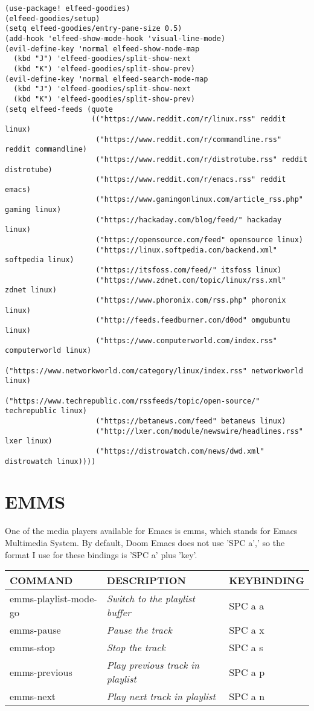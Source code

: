 \documentclass[11pt]{article}
\begin{document}
\begin{verbatim}
(use-package! elfeed-goodies)
(elfeed-goodies/setup)
(setq elfeed-goodies/entry-pane-size 0.5)
(add-hook 'elfeed-show-mode-hook 'visual-line-mode)
(evil-define-key 'normal elfeed-show-mode-map
  (kbd "J") 'elfeed-goodies/split-show-next
  (kbd "K") 'elfeed-goodies/split-show-prev)
(evil-define-key 'normal elfeed-search-mode-map
  (kbd "J") 'elfeed-goodies/split-show-next
  (kbd "K") 'elfeed-goodies/split-show-prev)
(setq elfeed-feeds (quote
                    (("https://www.reddit.com/r/linux.rss" reddit linux)
                     ("https://www.reddit.com/r/commandline.rss" reddit commandline)
                     ("https://www.reddit.com/r/distrotube.rss" reddit distrotube)
                     ("https://www.reddit.com/r/emacs.rss" reddit emacs)
                     ("https://www.gamingonlinux.com/article_rss.php" gaming linux)
                     ("https://hackaday.com/blog/feed/" hackaday linux)
                     ("https://opensource.com/feed" opensource linux)
                     ("https://linux.softpedia.com/backend.xml" softpedia linux)
                     ("https://itsfoss.com/feed/" itsfoss linux)
                     ("https://www.zdnet.com/topic/linux/rss.xml" zdnet linux)
                     ("https://www.phoronix.com/rss.php" phoronix linux)
                     ("http://feeds.feedburner.com/d0od" omgubuntu linux)
                     ("https://www.computerworld.com/index.rss" computerworld linux)
                     ("https://www.networkworld.com/category/linux/index.rss" networkworld linux)
                     ("https://www.techrepublic.com/rssfeeds/topic/open-source/" techrepublic linux)
                     ("https://betanews.com/feed" betanews linux)
                     ("http://lxer.com/module/newswire/headlines.rss" lxer linux)
                     ("https://distrowatch.com/news/dwd.xml" distrowatch linux))))
\end{verbatim}

\section{EMMS}
\label{sec:orgd5b87b6}
One of the media players available for Emacs is emms, which stands for Emacs Multimedia System.  By default, Doom Emacs does not use 'SPC a',' so the format I use for these bindings is 'SPC a' plus 'key'.

\begin{center}
\begin{tabular}{lll}
COMMAND & DESCRIPTION & KEYBINDING\\[0pt]
\hline
emms-playlist-mode-go & \emph{Switch to the playlist buffer} & SPC a a\\[0pt]
emms-pause & \emph{Pause the track} & SPC a x\\[0pt]
emms-stop & \emph{Stop the track} & SPC a s\\[0pt]
emms-previous & \emph{Play previous track in playlist} & SPC a p\\[0pt]
emms-next & \emph{Play next track in playlist} & SPC a n\\[0pt]
\end{tabular}
\end{center}
\end{document}
